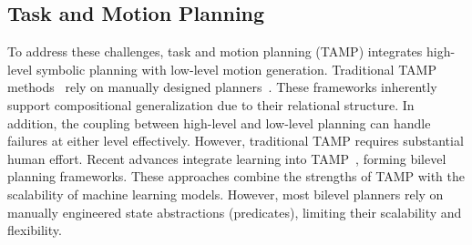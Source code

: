 \subsection{Task and Motion Planning}
To address these challenges, task and motion planning (TAMP) integrates high-level symbolic planning with low-level motion generation. 
Traditional TAMP methods~\cite{garrett2021integrated,garrett2020pddlstream} rely on manually designed planners~\cite{McDermott1998PDDL,karaman2011anytime}. 
These frameworks inherently support compositional generalization due to their relational structure. 
In addition, the coupling between high-level and low-level planning can handle failures at either level effectively.
However, traditional TAMP requires substantial human effort. 
Recent advances integrate learning into TAMP~\cite{chitnis2021nsrt,bougie2020skill,kumar2023predict,silver2023predicateinvent,liang2024visualpredicator,kumar2024openworld,yang2024guidinglonghorizontaskmotion}, forming bilevel planning frameworks. 
These approaches combine the strengths of TAMP with the scalability of machine learning models. 
However, most bilevel planners rely on manually engineered state abstractions (predicates), limiting their scalability and flexibility.

